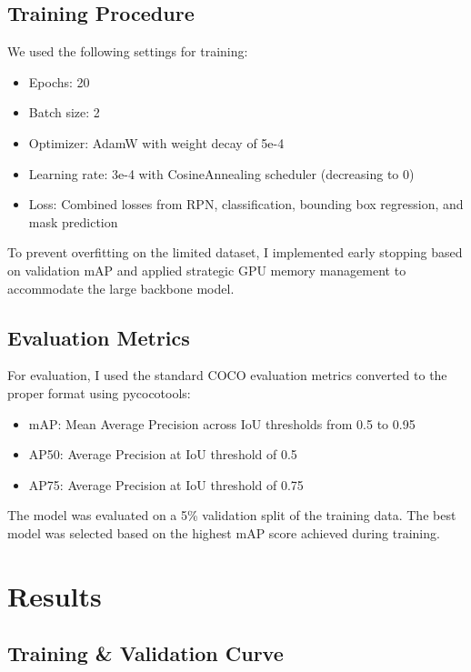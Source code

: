 \documentclass[twocolumn,a4paper]{article}
\begin{document}
\subsection{Training Procedure}
We used the following settings for training:
\begin{itemize}
    \item Epochs: 20
    \item Batch size: 2
    \item Optimizer: AdamW with weight decay of 5e-4
    \item Learning rate: 3e-4 with CosineAnnealing scheduler (decreasing to 0)
    \item Loss: Combined losses from RPN, classification, bounding box regression, and mask prediction
\end{itemize}

To prevent overfitting on the limited dataset, I implemented early stopping based on validation mAP and applied strategic GPU memory management to accommodate the large backbone model.

\subsection{Evaluation Metrics}
For evaluation, I used the standard COCO evaluation metrics converted to the proper format using pycocotools\cite{cocoeval2015,lin2014microsoft}:

\begin{itemize}
    \item mAP: Mean Average Precision across IoU thresholds from 0.5 to 0.95
    \item AP50: Average Precision at IoU threshold of 0.5
    \item AP75: Average Precision at IoU threshold of 0.75
\end{itemize}

The model was evaluated on a 5\% validation split of the training data. The best model was selected based on the highest mAP score achieved during training.

\section{Results}

\subsection{Training \& Validation Curve}
\end{document}
